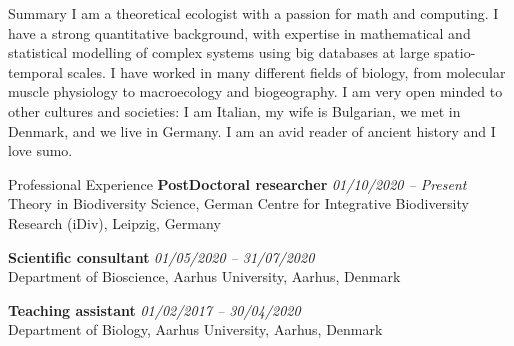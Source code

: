 \documentclass{resume} %
\begin{document}
\begin{rSection}{Summary}
I am a theoretical ecologist with a passion for math and computing.
I have a strong quantitative background, with expertise in mathematical and statistical modelling of complex systems using big databases at large spatio-temporal scales.
I have worked in many different fields of biology, from molecular muscle physiology to macroecology and biogeography.
I am very open minded to other cultures and societies: I am Italian, my wife is Bulgarian, we met in Denmark, and we live in Germany.
I am an avid reader of ancient history and I love sumo.
\end{rSection}

\begin{rSection}{Professional Experience}
{\bf PostDoctoral researcher} \hfill {\em 01/10/2020 -- Present}\\
Theory in Biodiversity Science, German Centre for Integrative Biodiversity Research (iDiv), Leipzig, Germany

{\bf Scientific consultant} \hfill {\em 01/05/2020 -- 31/07/2020}\\
Department of Bioscience, Aarhus University, Aarhus, Denmark

{\bf Teaching assistant} \hfill {\em 01/02/2017 -- 30/04/2020}\\
Department of Biology, Aarhus University, Aarhus, Denmark
\end{rSection}

\end{document}
